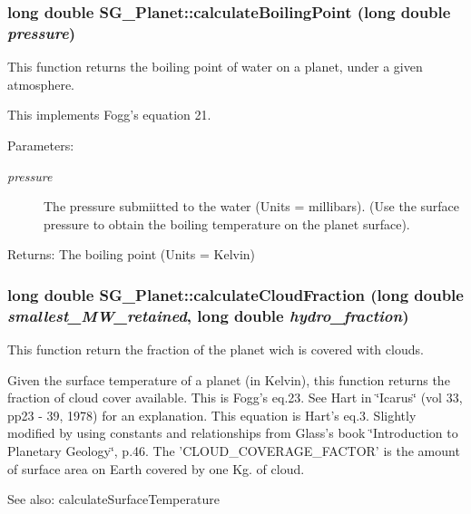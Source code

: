 \subsubsection{\setlength{\rightskip}{0pt plus 5cm}long double SG\_\-Planet::calculate\-Boiling\-Point (long double {\em pressure})\hspace{0.3cm}{\tt  [protected]}}\label{class_s_g___planet_b17}


This function returns the boiling point of water on a planet, under a given atmosphere. 

This implements Fogg's equation 21. \begin{Desc}
\item[Parameters:]
\begin{description}
\item[{\em pressure}]The pressure submiitted to the water (Units = millibars). (Use the surface pressure to obtain the boiling temperature on the planet surface). \end{description}
\end{Desc}
\begin{Desc}
\item[Returns:]The boiling point (Units = Kelvin) \end{Desc}
\subsubsection{\setlength{\rightskip}{0pt plus 5cm}long double SG\_\-Planet::calculate\-Cloud\-Fraction (long double {\em smallest\_\-MW\_\-retained}, long double {\em hydro\_\-fraction})\hspace{0.3cm}{\tt  [protected]}}\label{class_s_g___planet_b22}


This function return the fraction of the planet wich is covered with clouds. 

Given the surface temperature of a planet (in Kelvin), this function returns the fraction of cloud cover available. This is Fogg's eq.23. See Hart in \char`\"{}Icarus\char`\"{} (vol 33, pp23 - 39, 1978) for an explanation. This equation is Hart's eq.3. Slightly modified by using constants and relationships from Glass's book \char`\"{}Introduction to Planetary Geology\char`\"{}, p.46. The 'CLOUD\_\-COVERAGE\_\-FACTOR' is the amount of surface area on Earth covered by one Kg. of cloud. \begin{Desc}
\item[See also:]calculate\-Surface\-Temperature \end{Desc}

